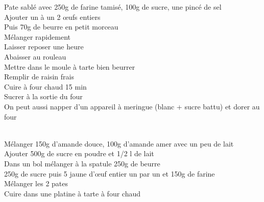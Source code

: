 \begin{minipage}[c]{\textwidth}
Pate sablé avec 250g de farine tamisé, 100g de sucre, une pincé de sel\\
Ajouter un à un 2 œufs entiers\\
Puis 70g de beurre en petit morceau\\
Mélanger rapidement\\
Laisser reposer une heure\\
Abaisser au rouleau\\
Mettre dans le moule à tarte bien beurrer\\
Remplir de raisin frais\\
Cuire à four chaud 15 min \\
Sucrer à la sortie du four\\
On peut aussi napper d'un appareil à meringue (blanc + sucre battu) et dorer au four\\
\\

\end{minipage}

\begin{minipage}[c]{\textwidth}
Mélanger 150g d'amande douce, 100g d'amande amer avec un peu de lait\\
Ajouter 500g de sucre en poudre et 1/2 l de lait\\
Dans un bol mélanger à la spatule 250g de beurre\\
250g de sucre puis 5 jaune d'œuf entier un par un et 150g de farine\\
Mélanger les 2 pates\\
Cuire dans une platine à tarte à four chaud\\
\\

\end{minipage}

